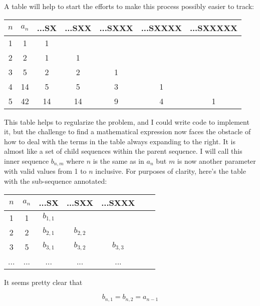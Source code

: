 \documentclass{article}
\begin{document}
\par

A table will help to start the efforts to make this process possibly easier to track:

\begin{table}[h!]
\centering
 \begin{tabular}{|c | c | c | c | c | c | c|} 
 \hline
 $n$ & $a_n$ & ...SX & ...SXX & ...SXXX & ...SXXXX & ...SXXXXX \\ [0.5ex] 
 \hline
 1 & 1 & 1 &  &  &  & \\ 
 2 & 2 & 1 & 1 &  &  & \\
 3 & 5 & 2 & 2 & 1 &  & \\
 4 & 14 & 5 & 5 & 3 & 1 & \\
 5 & 42 & 14 & 14 & 9 & 4 & 1 \\
 \hline
 \end{tabular}
\end{table}

This table helps to regularize the problem, and I could write code to implement it, but the challenge to find a mathematical expression now faces the obstacle of how to deal with the terms in the table always expanding to the right.  It is almost like a set of child sequences within the parent sequence.  I will call this inner sequence $b_{n,m}$ where $n$ is the same as in $a_n$ but $m$ is now another parameter with valid values from 1 to $n$ inclusive.  For purposes of clarity, here's the table with the sub-sequence annotated:

\begin{table}[h!]
  \centering
   \begin{tabular}{|c | c | c | c | c | c | c|} 
   \hline
   $n$ & $a_n$ & ...SX & ...SXX & ...SXXX \\ [0.5ex] 
   \hline
   1 & 1 & $b_{1,1}$ &  & \\ 
   2 & 2 & $b_{2,1}$ & $b_{2,2}$ & \\
   3 & 5 & $b_{3,1}$ & $b_{3,2}$ & $b_{3,3}$ \\
   ... & ... & ... & ... & ... \\
   \hline
   \end{tabular}
  \end{table}

\par

It seems pretty clear that

\begin{equation*}
  b_{n,1} = b_{n,2} = a_{n-1}
\end{equation*}
\end{document}
